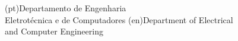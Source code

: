 



\ntdepartment(pt){Departamento de Engenharia\\ Eletrotécnica e de Computadores}
\ntdepartment(en){Department of Electrical\\ and Computer Engineering}









